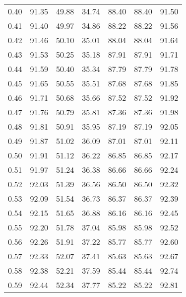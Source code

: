 \begin{tabular}{|c|c|c|c|c|c|c|}
      0.40 &     91.35 &     49.88 &      34.74 &   88.40 &      88.40 &         91.50 \\
      0.41 &     91.40 &     49.97 &      34.86 &   88.22 &      88.22 &         91.56 \\
      0.42 &     91.46 &     50.10 &      35.01 &   88.04 &      88.04 &         91.64 \\
      0.43 &     91.53 &     50.25 &      35.18 &   87.91 &      87.91 &         91.71 \\
      0.44 &     91.59 &     50.40 &      35.34 &   87.79 &      87.79 &         91.78 \\
      0.45 &     91.65 &     50.55 &      35.51 &   87.68 &      87.68 &         91.85 \\
      0.46 &     91.71 &     50.68 &      35.66 &   87.52 &      87.52 &         91.92 \\
      0.47 &     91.76 &     50.79 &      35.81 &   87.36 &      87.36 &         91.98 \\
      0.48 &     91.81 &     50.91 &      35.95 &   87.19 &      87.19 &         92.05 \\
      0.49 &     91.87 &     51.02 &      36.09 &   87.01 &      87.01 &         92.11 \\
      0.50 &     91.91 &     51.12 &      36.22 &   86.85 &      86.85 &         92.17 \\
      0.51 &     91.97 &     51.24 &      36.38 &   86.66 &      86.66 &         92.24 \\
      0.52 &     92.03 &     51.39 &      36.56 &   86.50 &      86.50 &         92.32 \\
      0.53 &     92.09 &     51.54 &      36.73 &   86.37 &      86.37 &         92.39 \\
      0.54 &     92.15 &     51.65 &      36.88 &   86.16 &      86.16 &         92.45 \\
      0.55 &     92.20 &     51.78 &      37.04 &   85.98 &      85.98 &         92.52 \\
      0.56 &     92.26 &     51.91 &      37.22 &   85.77 &      85.77 &         92.60 \\
      0.57 &     92.33 &     52.07 &      37.41 &   85.63 &      85.63 &         92.67 \\
      0.58 &     92.38 &     52.21 &      37.59 &   85.44 &      85.44 &         92.74 \\
      0.59 &     92.44 &     52.34 &      37.77 &   85.22 &      85.22 &         92.81 \\

\end{tabular}

